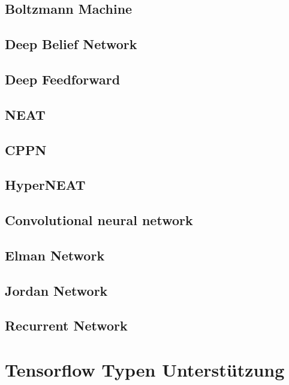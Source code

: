 \subsection{Boltzmann Machine}

\subsection{Deep Belief Network}

\subsection{Deep Feedforward}

\subsection{NEAT}

\subsection{CPPN}

\subsection{HyperNEAT}

\subsection{Convolutional neural network}

\subsection{Elman Network}

\subsection{Jordan Network}

\subsection{Recurrent Network}

\section{Tensorflow Typen Unterstützung}

